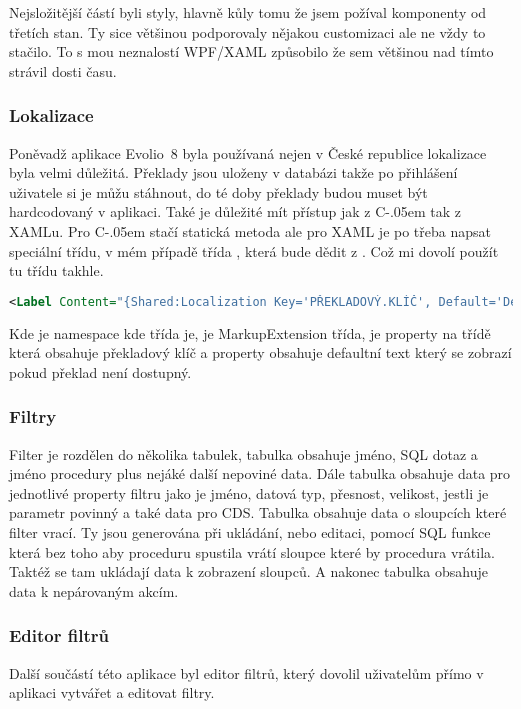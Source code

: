 \documentclass[czech,bachelor,dept460,male,csharp]{diploma}
\newcommand{\EvolioEight}{Evolio~8}
\newcommand{\Csharp}{%
  {\settoheight{\dimen0}{C}C\kern-.05em \resizebox{!}{\dimen0}{\raisebox{\depth}{\#}}}}
\newcommand{\un}{\underline{ }}
\begin{document}
			Nejsložitější částí byli styly, hlavně kůly tomu že jsem požíval komponenty od třetích stan. Ty sice většinou podporovaly nějakou customizaci ale ne vždy to stačilo. To s mou neznalostí WPF/XAML způsobilo že sem většinou nad tímto strávil dosti času.
		\subsubsection{Lokalizace}
			Poněvadž aplikace {\EvolioEight} byla používaná nejen v České republice lokalizace byla velmi důležitá. Překlady jsou uloženy v databázi takže po přihlášení uživatele si je můžu stáhnout, do té doby  překlady budou muset být hardcodovaný v aplikaci. Také je důležité mít přístup jak z {\Csharp} tak z XAMLu. Pro {\Csharp} stačí statická metoda ale pro XAML je po třeba napsat speciální třídu, v mém případě třída , která bude dědit z . Což mi dovolí použít tu třídu takhle.
			\begin{lstlisting}[language=XML,caption={MarkupExtension příkad},label=MarkupExtension]
<Label Content="{Shared:Localization Key='PŘEKLADOVÝ.KLÍČ', Default='Defaultní text'}"/>
			\end{lstlisting}
			 
			 Kde  je namespace kde třída  je,  je MarkupExtension třída,  je property na třídě  která obsahuje překladový klíč a property  obsahuje defaultní text který se zobrazí pokud překlad není dostupný.
		\subsubsection{Filtry}
			Filter je rozdělen do několika tabulek, tabulka  obsahuje jméno, SQL dotaz a jméno procedury plus nejáké další nepoviné data. 
			Dále tabulka  obsahuje data pro jednotlivé property filtru jako je jméno, datová typ, přesnost, velikost, jestli je parametr povinný a také data pro CDS. Tabulka  obsahuje data o sloupcích které filter vrací. 
			Ty jsou generována při ukládání, nebo editaci, pomocí SQL funkce \uv{sys.sp{\un}describe{\un}first{\un}result{\un}set} která bez toho aby proceduru spustila vrátí sloupce které by procedura vrátila. 
			Taktéž se tam ukládají data k zobrazení sloupců. A nakonec tabulka  obsahuje data k nepárovaným akcím.
	
		\subsubsection{Editor filtrů}
			Další součástí této aplikace byl editor filtrů, který dovolil uživatelům přímo v aplikaci vytvářet a editovat filtry. 
			
\end{document}
